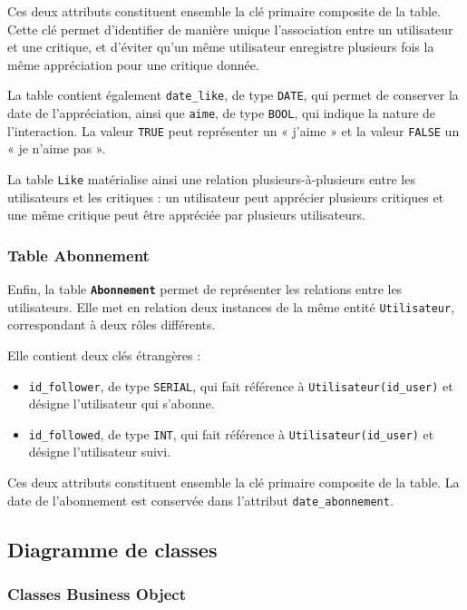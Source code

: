\documentclass[
  letterpaper,
  DIV=11,
  numbers=noendperiod]{scrartcl}
\providecommand{\tightlist}{%
  \setlength{\itemsep}{0pt}\setlength{\parskip}{0pt}}
\begin{document}
Ces deux attributs constituent ensemble la clé primaire composite de la
table. Cette clé permet d'identifier de manière unique l'association
entre un utilisateur et une critique, et d'éviter qu'un même utilisateur
enregistre plusieurs fois la même appréciation pour une critique donnée.

La table contient également \texttt{date\_like}, de type \texttt{DATE},
qui permet de conserver la date de l'appréciation, ainsi que
\texttt{aime}, de type \texttt{BOOL}, qui indique la nature de
l'interaction. La valeur \texttt{TRUE} peut représenter un « j'aime » et
la valeur \texttt{FALSE} un « je n'aime pas ».

La table \texttt{Like} matérialise ainsi une relation
plusieurs-à-plusieurs entre les utilisateurs et les critiques : un
utilisateur peut apprécier plusieurs critiques et une même critique peut
être appréciée par plusieurs utilisateurs.

\subsubsection{Table Abonnement}\label{table-abonnement}

Enfin, la table \textbf{\texttt{Abonnement}} permet de représenter les
relations entre les utilisateurs. Elle met en relation deux instances de
la même entité \texttt{Utilisateur}, correspondant à deux rôles
différents.

Elle contient deux clés étrangères :

\begin{itemize}
\tightlist
\item
  \texttt{id\_follower}, de type \texttt{SERIAL}, qui fait référence à
  \texttt{Utilisateur(id\_user)} et désigne l'utilisateur qui s'abonne.
\item
  \texttt{id\_followed}, de type \texttt{INT}, qui fait référence à
  \texttt{Utilisateur(id\_user)} et désigne l'utilisateur suivi.
\end{itemize}

Ces deux attributs constituent ensemble la clé primaire composite de la
table. La date de l'abonnement est conservée dans l'attribut
\texttt{date\_abonnement}.

\subsection{Diagramme de classes}\label{diagramme-de-classes}

\subsubsection{Classes Business Object}\label{classes-business-object}
\end{document}
